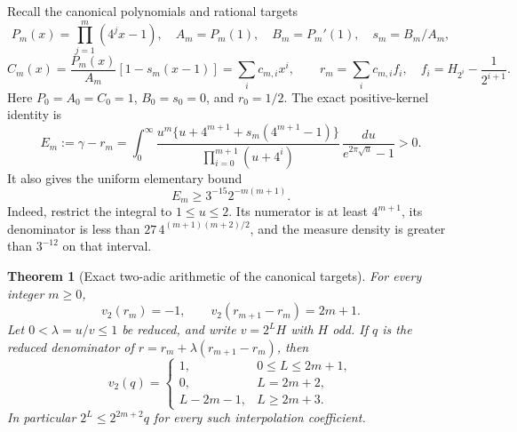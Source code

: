 \documentclass[11pt,a4paper]{article}
\newtheorem{theorem}{Theorem}[section]
\theoremstyle{definition}
\theoremstyle{remark}
\begin{document}
Recall the canonical polynomials and rational targets
\[
 P_m(x)=\prod_{j=1}^m(4^jx-1),\quad A_m=P_m(1),\quad
 B_m=P_m'(1),\quad s_m=B_m/A_m,
\]
\[
 C_m(x)=\frac{P_m(x)}{A_m}[1-s_m(x-1)]=\sum_i c_{m,i}x^i,
 \qquad
 r_m=\sum_i c_{m,i}f_i,
 \quad f_i=H_{2^i}-\frac1{2^{i+1}}.
\]
Here $P_0=A_0=C_0=1$, $B_0=s_0=0$, and $r_0=1/2$.
The exact positive-kernel identity is
\[
 E_m:=\gamma-r_m
 =\int_0^\infty
 \frac{u^m\{u+4^{m+1}+s_m(4^{m+1}-1)\}}
 {\prod_{i=0}^{m+1}(u+4^i)}\,
 \frac{du}{e^{2\pi\sqrt u}-1}>0.
\]
It also gives the uniform elementary bound
\begin{equation}\label{stage3-arithmetic-raw-lower}
 E_m\ge 3^{-15}2^{-m(m+1)}.
\end{equation}
Indeed, restrict the integral to $1\le u\le2$. Its numerator is at
least $4^{m+1}$, its denominator is less than
$27\,4^{(m+1)(m+2)/2}$, and the measure density is greater than
$3^{-12}$ on that interval.

\begin{theorem}[Exact two-adic arithmetic of the canonical targets]
\label{stage3-arithmetic-two-adic}
For every integer $m\ge0$,
\[
 v_2(r_m)=-1,\qquad v_2(r_{m+1}-r_m)=2m+1.
\]
Let $0<\lambda=u/v\le1$ be reduced, and write $v=2^L H$ with $H$ odd.
If $q$ is the reduced denominator of
$r=r_m+\lambda(r_{m+1}-r_m)$, then
\[
 v_2(q)=
 \begin{cases}
 1,&0\le L\le2m+1,\\
 0,&L=2m+2,\\
 L-2m-1,&L\ge2m+3.
 \end{cases}
\]
In particular $2^L\le2^{2m+2}q$ for every such interpolation coefficient.
\end{theorem}
\end{document}
